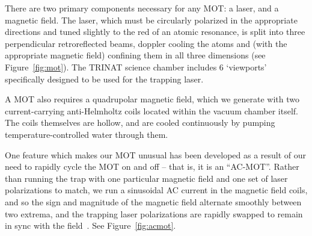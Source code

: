 There are two primary components necessary for any MOT:  a laser, and a magnetic field.  The laser, which must be circularly polarized in the appropriate directions and tuned slightly to the red of an atomic resonance, is split into three perpendicular retroreflected beams, doppler cooling the atoms and (with the appropriate magnetic field) confining them in all three dimensions (see Figure~\ref{fig:mot}).  The TRINAT science chamber includes 6 `viewports' specifically designed to be used for the trapping laser.

A MOT also requires a quadrupolar magnetic field, which we generate with two current-carrying anti-Helmholtz coils located within the vacuum chamber itself.  The coils themselves are hollow, and are cooled continuously by pumping temperature-controlled water through them.   

One feature which makes our MOT unusual has been developed as a result of our need to rapidly cycle the MOT on and off -- that is, it is an ``AC-MOT''.  Rather than running the trap with one particular magnetic field and one set of laser polarizations to match, we run a sinusoidal AC current in the magnetic field coils, and so the sign and magnitude of the magnetic field alternate smoothly between two extrema, and the trapping laser polarizations are rapidly swapped to remain in sync with the field~\cite{harveymurray}\cite{thesis}.  See Figure~\ref{fig:acmot}.  




